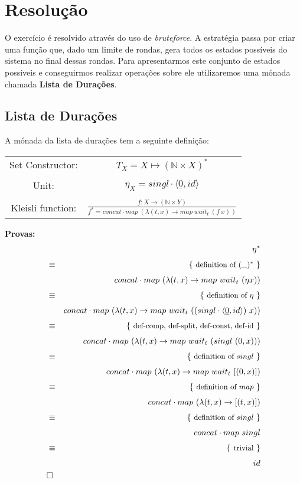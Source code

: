 \documentclass[12pt]{extarticle}
\newcommand{\ffrac}[2]{\ensuremath{\frac{\displaystyle #1}{\displaystyle #2}}}
\def\comp{\mathbin{\cdot}}
\def\start{&&}
\def\qed{\\&\Box&}
\def\just#1#2{\\ &#1& \rule{2em}{0pt} \{ \mbox{\rule[-.7em]{0pt}{1.8em} \small #2 \/} \} \nonumber\\ && }
\begin{document}
\section{Resolução}
O exercício é resolvido através do uso de \textit{bruteforce}.
A estratégia passa por criar uma função que, dado um limite de rondas, gera todos os estados possíveis do sistema no final dessas rondas.
Para apresentarmos este conjunto de estados possíveis e conseguirmos realizar operações sobre ele utilizaremos uma mónada chamada \textbf{Lista de Durações}.

\subsection{Lista de Durações}
A mónada da lista de durações tem a seguinte definição:
\begin{center}
    \begin{tabular}{ c c }
        Set Constructor: & $T_X = X \mapsto (\mathbb{N} \times X)^* $ \\\\  
        Unit: & $\eta_X = singl \comp \langle \underline{0}, id \rangle $ \\\\ 
        Kleisli function: & $\ffrac{f : X \rightarrow (\mathbb{N} \times Y)}{f^* = concat \comp map\ (\lambda (t,x) \rightarrow map\ wait_t\ (f\ x))}$ 
    \end{tabular}
\end{center}

\textbf{Provas:}
\begin{eqnarray*}
    \start
        \eta^*
    \just\equiv{ definition of $(\_)^*$ }
        concat \comp map\ (\lambda (t,x) \rightarrow map\ wait_t\ (\eta x))
    \just\equiv{ definition of $\eta$ }
        concat \comp map\ (\lambda (t,x) \rightarrow map\ wait_t\ ((singl \comp \langle \underline{0}, id \rangle)\ x))
    \just\equiv{ def-comp, def-split, def-const, def-id }
        concat \comp map\ (\lambda (t,x) \rightarrow map\ wait_t\ (singl\ (0, x)))
    \just\equiv{ definition of $singl$ }
        concat \comp map\ (\lambda (t,x) \rightarrow map\ wait_t\ [(0, x)])
    \just\equiv{ definition of $map$ }
        concat \comp map\ (\lambda (t,x) \rightarrow [(t,x)])
    \just\equiv{ definition of $singl$ }
        concat \comp map\ singl
    \just\equiv{ trivial }
        id
    \qed
\end{eqnarray*}
\end{document}
